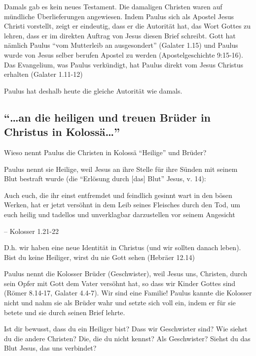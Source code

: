\documentclass[
  12pt,
]{krantz}
\makeatletter
\newenvironment{kframe}{%
\medskip{}
\setlength{\fboxsep}{.8em}
 \def\at@end@of@kframe{}%
 \ifinner\ifhmode%
  \def\at@end@of@kframe{\end{minipage}}%
  \begin{minipage}{\columnwidth}%
 \fi\fi%
 \def\FrameCommand##1{\hskip\@totalleftmargin \hskip-\fboxsep
 \colorbox{shadecolor}{##1}\hskip-\fboxsep
     \hskip-\linewidth \hskip-\@totalleftmargin \hskip\columnwidth}%
 \MakeFramed {\advance\hsize-\width
   \@totalleftmargin\z@ \linewidth\hsize
   \@setminipage}}%
 {\par\unskip\endMakeFramed%
 \at@end@of@kframe}
\newenvironment{rmdblock}[1]
  {
  \begin{itemize}
  \renewcommand{\labelitemi}{
    \raisebox{-.7\height}[0pt][0pt]{
      {\setkeys{Gin}{width=3em,keepaspectratio}\texttt{[image: img/\#1]}}
    }
  }
  \setlength{\fboxsep}{1em}
  \begin{kframe}
  \item
  }
  {
  \end{kframe}
  \end{itemize}
  }
\newenvironment{rmdquestion}
  {\begin{rmdblock}{question}}
  {\end{rmdblock}}
\newenvironment{rmdquote}
  {\begin{rmdblock}{quote}}
  {\end{rmdblock}}
\makeatother
\begin{document}
Damals gab es kein neues Testament. Die damaligen Christen waren auf mündliche
Überlieferungen angewiesen. Indem Paulus sich als Apostel Jesus Christi
vorstellt, zeigt er eindeutig, dass er die Autorität hat, das Wort Gottes zu
lehren, dass er im direkten Auftrag von Jesus diesen Brief schreibt.
Gott hat nämlich Paulus ``vom Mutterleib an ausgesondert'' (Galater 1.15)
und Paulus wurde von Jesus selber berufen Apostel zu werden (Apostelgeschichte 9:15-16). Das Evangelium,
was Paulus verkündigt, hat Paulus direkt vom Jesus Christus erhalten (Galater 1.11-12)

Paulus hat deshalb heute die gleiche Autorität wie damals.

\hypertarget{an-die-heiligen-und-treuen-bruxfcder-in-christus-in-kolossuxe4}{%
\subsection{\texorpdfstring{``\ldots an die heiligen und treuen Brüder in Christus in Kolossä\ldots{}''}{``\ldots an die heiligen und treuen Brüder in Christus in Kolossä\ldots''}}\label{an-die-heiligen-und-treuen-bruxfcder-in-christus-in-kolossuxe4}}

Wieso nennt Paulus die Christen in Kolossä ``Heilige'' und Brüder?

Paulus nennt sie Heilige, weil Jesus an ihre Stelle für ihre Sünden mit seinem
Blut bestraft wurde (die ``Erlösung durch {[}das{]} Blut'' Jesus, v. 14):

\begin{rmdquote}
Auch euch, die ihr einst entfremdet und feindlich gesinnt wart in den
bösen Werken, hat er jetzt versöhnt in dem Leib seines Fleisches durch
den Tod, um euch heilig und tadellos und unverklagbar darzustellen vor
seinem Angesicht

-- Kolosser 1.21-22
\end{rmdquote}

D.h. wir haben eine neue Identität in Christus (und wir sollten danach leben). Bist du keine Heiliger, wirst du nie Gott sehen (Hebräer 12.14)

Paulus nennt die Kolosser Brüder (Geschwister), weil Jesus uns, Christen, durch sein Opfer mit Gott dem Vater versöhnt hat, so dass wir Kinder Gottes sind (Römer 8.14-17, Galater 4.4-7). Wir sind eine Familie! Paulus kannte die Kolosser nicht und nahm sie als Brüder wahr und setzte sich voll ein, indem er für sie betete und sie durch seinen Brief lehrte.

\begin{rmdquestion}
Ist dir bewusst, dass du ein Heiliger bist? Dass wir Geschwister sind?
Wie siehst du die andere Christen? Die, die du nicht kennst? Als
Geschwister? Siehst du das Blut Jesus, das uns verbindet?
\end{rmdquestion}
\end{document}
